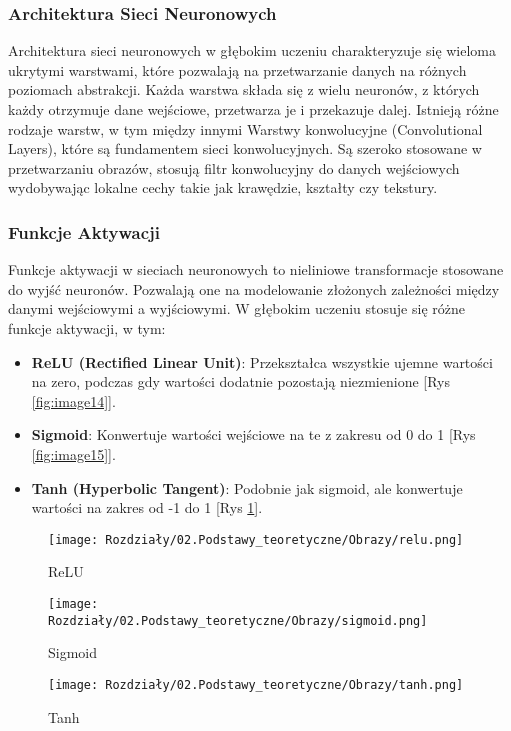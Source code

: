 \subsubsection*{Architektura Sieci Neuronowych}
Architektura sieci neuronowych w głębokim uczeniu charakteryzuje się wieloma ukrytymi warstwami, które pozwalają na przetwarzanie danych na różnych poziomach abstrakcji. Każda warstwa składa się z wielu neuronów, z których każdy otrzymuje dane wejściowe, przetwarza je i przekazuje dalej. Istnieją różne rodzaje warstw, w tym między innymi Warstwy konwolucyjne (Convolutional Layers), które są fundamentem sieci konwolucyjnych. Są szeroko stosowane w przetwarzaniu obrazów, stosują filtr konwolucyjny do danych wejściowych wydobywając lokalne cechy takie jak krawędzie, kształty czy tekstury.


\subsubsection*{Funkcje Aktywacji}
Funkcje aktywacji w sieciach neuronowych to nieliniowe transformacje stosowane do wyjść neuronów. Pozwalają one na modelowanie złożonych zależności między danymi wejściowymi a wyjściowymi. W głębokim uczeniu stosuje się różne funkcje aktywacji, w tym:
\begin{itemize}
    \item \textbf{ReLU (Rectified Linear Unit)}: Przekształca wszystkie ujemne wartości na zero, podczas gdy wartości dodatnie pozostają niezmienione  [Rys \ref{fig:image14}].
    \item \textbf{Sigmoid}: Konwertuje wartości wejściowe na te z zakresu od 0 do 1 [Rys \ref{fig:image15}].
    \item \textbf{Tanh (Hyperbolic Tangent)}: Podobnie jak sigmoid, ale konwertuje wartości na zakres od -1 do 1 [Rys \ref{fig:image16}].
\end{itemize}

\begin{figure}[H]
    \centering
    \begin{minipage}[t]{0.27\linewidth}
        \texttt{[image: Rozdziały/02.Podstawy\_teoretyczne/Obrazy/relu.png]}
        \caption{ReLU}
        \label{fig:image14}
    \end{minipage}
    \hspace{0.5cm}
    \begin{minipage}[t]{0.27\linewidth}
        \texttt{[image: Rozdziały/02.Podstawy\_teoretyczne/Obrazy/sigmoid.png]}
        \caption{Sigmoid}
        \label{fig:image15}
    \end{minipage}
    \hspace{0.5cm}
    \begin{minipage}[t]{0.27\linewidth}
        \texttt{[image: Rozdziały/02.Podstawy\_teoretyczne/Obrazy/tanh.png]}
        \caption{Tanh}
        \label{fig:image16}
    \end{minipage}
\end{figure}



